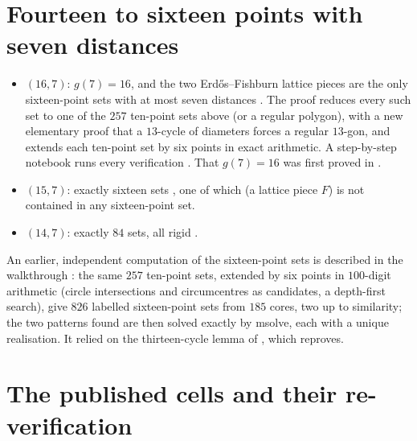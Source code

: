 \documentclass[11pt]{amsart}
\theoremstyle{remark}
\begin{document}
\section{Fourteen to sixteen points with seven distances}\label{sec:top}

\begin{itemize}
\item $(16,7)$: $g(7)=16$, and the two Erdős--Fishburn lattice pieces are the only sixteen-point sets with
  at most seven distances \cite[Theorem~1]{AC}. The proof reduces every such set to one of the $257$
  ten-point sets above (or a regular polygon), with a new elementary proof that a $13$-cycle of diameters
  forces a regular $13$-gon, and extends each ten-point set by six points in exact arithmetic. A
  step-by-step notebook runs every verification \cite{ACnb}. That $g(7)=16$ was first proved in \cite{AA}.
\item $(15,7)$: exactly sixteen sets \cite[Theorem~16]{AC}, one of which (a lattice piece $F$) is not
  contained in any sixteen-point set.
\item $(14,7)$: exactly $84$ sets, all rigid \cite{AC14}.
\end{itemize}

An earlier, independent computation of the sixteen-point sets is described in the walkthrough
\cite{repro}: the same $257$ ten-point sets, extended by six points in $100$-digit arithmetic (circle
intersections and circumcentres as candidates, a depth-first search), give $826$ labelled sixteen-point sets
from $185$ cores, two up to similarity; the two patterns found are then solved exactly by msolve, each with a
unique realisation. It relied on the thirteen-cycle lemma of \cite{AA}, which \cite{AC} reproves.

\section{The published cells and their re-verification}\label{sec:published}
\end{document}
